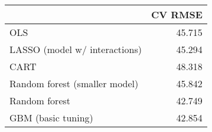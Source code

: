
\begin{tabular}{lr}
\toprule
  & CV RMSE\\
\midrule
OLS & 45.715\\
LASSO (model w/ interactions) & 45.294\\
CART & 48.318\\
Random forest (smaller model) & 45.842\\
Random forest & 42.749\\
GBM (basic tuning) & 42.854\\
\bottomrule
\end{tabular}